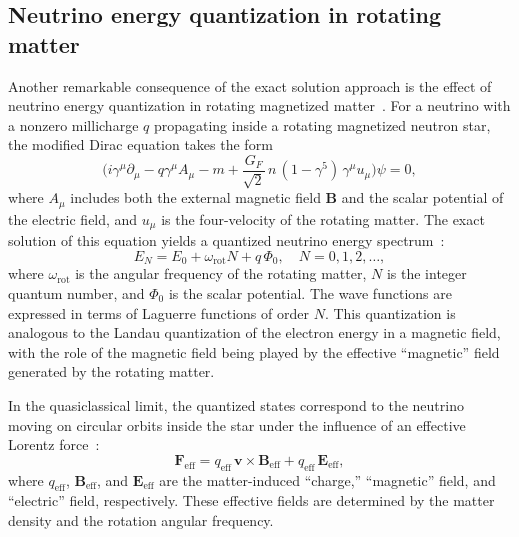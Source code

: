 \documentclass[a4paper,11pt]{article}
\begin{document}
\subsection{Neutrino energy quantization in rotating matter}

Another remarkable consequence of the exact solution approach is the effect of neutrino energy quantization in rotating magnetized matter~\cite{Grigoriev:Savochkin:Studenikin:2007,Studenikin:2008JPA,Studenikin:Tokarev:2014NPB}. For a neutrino with a nonzero millicharge $q$ propagating inside a rotating magnetized neutron star, the modified Dirac equation takes the form
\begin{equation}
\label{eq:Dirac_rotating}
\Big(i\gamma^\mu\partial_\mu - q\gamma^\mu A_\mu - m + \frac{G_F}{\sqrt{2}}\,n\,(1-\gamma^5)\,\gamma^\mu u_\mu\Big)\psi = 0,
\end{equation}
where $A_\mu$ includes both the external magnetic field $\mathbf{B}$ and the scalar potential of the electric field, and $u_\mu$ is the four-velocity of the rotating matter. The exact solution of this equation yields a quantized neutrino energy spectrum~\cite{Studenikin:Tokarev:2014NPB}:
\begin{equation}
\label{eq:E_quantized}
E_N = E_0 + \omega_{\text{rot}} N + q\,\Phi_0, \quad N = 0, 1, 2, \ldots,
\end{equation}
where $\omega_{\text{rot}}$ is the angular frequency of the rotating matter, $N$ is the integer quantum number, and $\Phi_0$ is the scalar potential. The wave functions are expressed in terms of Laguerre functions of order $N$. This quantization is analogous to the Landau quantization of the electron energy in a magnetic field, with the role of the magnetic field being played by the effective ``magnetic'' field generated by the rotating matter.

In the quasiclassical limit, the quantized states correspond to the neutrino moving on circular orbits inside the star under the influence of an effective Lorentz force~\cite{Studenikin:2008JPA}:
\begin{equation}
\label{eq:F_eff}
\mathbf{F}_{\text{eff}} = q_{\text{eff}}\,\mathbf{v} \times \mathbf{B}_{\text{eff}} + q_{\text{eff}}\,\mathbf{E}_{\text{eff}},
\end{equation}
where $q_{\text{eff}}$, $\mathbf{B}_{\text{eff}}$, and $\mathbf{E}_{\text{eff}}$ are the matter-induced ``charge,'' ``magnetic'' field, and ``electric'' field, respectively. These effective fields are determined by the matter density and the rotation angular frequency.
\end{document}
